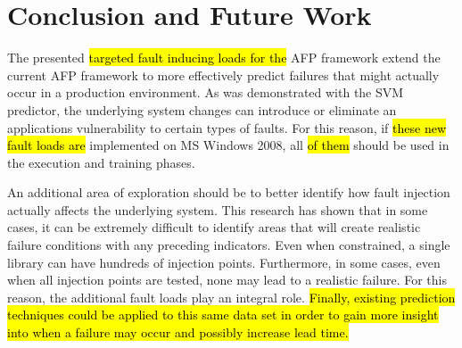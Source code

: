 \section{Conclusion and Future Work} \label{chapter5}
The presented \hl{targeted fault inducing loads for the} \ac{AFP} framework
extend the current \ac{AFP} framework to more effectively predict failures that
might actually occur in a production environment.  As was demonstrated with the
\ac{SVM} predictor, the underlying system changes can introduce or eliminate an
applications vulnerability to certain types of faults.  For this reason, if
\hl{these new fault loads are} implemented on \ac{MS} Windows 2008, all \hl{of
them} should be used in the execution and training phases.

An additional area of exploration should be to better identify how fault
injection actually affects the underlying system.  This research has shown that
in some cases, it can be extremely difficult to identify areas that will create
realistic failure conditions with any preceding indicators.  Even when
constrained, a single library can have hundreds of injection points.
Furthermore, in some cases, even when all injection points are tested, none may
lead to a realistic failure.  For this reason, the additional fault loads play
an integral role.  \hl{Finally, existing prediction techniques could be applied
to this same data set in order to gain more insight into when a failure may
occur and possibly increase lead time.}

